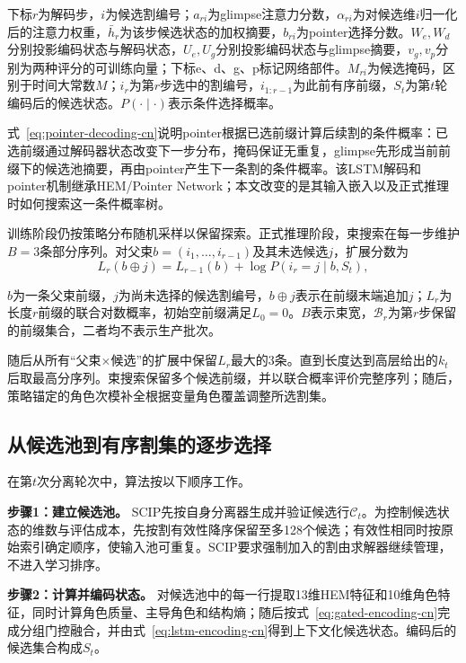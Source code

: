 \documentclass[final,5p,times,twocolumn]{elsarticle}
\begin{document}
下标$r$为解码步，$i$为候选割编号；$a_{ri}$为glimpse注意力分数，$\alpha_{ri}$为对候选维$i$归一化后的注意力权重，$\bar h_r$为该步候选状态的加权摘要，$b_{ri}$为pointer选择分数。$W_e,W_d$分别投影编码状态与解码状态，$U_e,U_g$分别投影编码状态与glimpse摘要，$v_g,v_p$分别为两种评分的可训练向量；下标e、d、g、p标记网络部件。$M_{ri}$为候选掩码，区别于时间大常数$M$；$i_r$为第$r$步选中的割编号，$i_{1:r-1}$为此前有序前缀，$S_t$为第$t$轮编码后的候选状态。$P(\cdot\mid\cdot)$表示条件选择概率。


式~\eqref{eq:pointer-decoding-cn}说明pointer根据已选前缀计算后续割的条件概率：已选前缀通过解码器状态改变下一步分布，掩码保证无重复，glimpse先形成当前前缀下的候选池摘要，再由pointer产生下一条割的条件概率。该LSTM解码和pointer机制继承HEM/Pointer Network；本文改变的是其输入嵌入以及正式推理时如何搜索这一条件概率树。

训练阶段仍按策略分布随机采样以保留探索。正式推理阶段，束搜索在每一步维护$B=3$条部分序列。对父束$b=(i_1,\ldots,i_{r-1})$及其未选候选$j$，扩展分数为
\begin{equation}
L_r(b\oplus j)=L_{r-1}(b)+\log P(i_r=j\mid b,S_t),
\label{eq:beam-score-cn}
\end{equation}

$b$为一条父束前缀，$j$为尚未选择的候选割编号，$b\oplus j$表示在前缀末端追加$j$；$L_r$为长度$r$前缀的联合对数概率，初始空前缀满足$L_0=0$。$B$表示束宽，$\mathcal B_r$为第$r$步保留的前缀集合，二者均不表示生产批次。


随后从所有“父束$\times$候选”的扩展中保留$L_r$最大的3条。直到长度达到高层给出的$k_t$后取最高分序列。束搜索保留多个候选前缀，并以联合概率评价完整序列；随后，策略锚定的角色次模补全根据变量角色覆盖调整所选割集。

\subsection{从候选池到有序割集的逐步选择}

在第$t$次分离轮次中，算法按以下顺序工作。

\noindent\textbf{步骤1：建立候选池。} SCIP先按自身分离器生成并验证候选行$\mathcal C_t$。为控制候选状态的维数与评估成本，先按割有效性降序保留至多128个候选；有效性相同时按原始索引确定顺序，使输入池可重复。SCIP要求强制加入的割由求解器继续管理，不进入学习排序。

\noindent\textbf{步骤2：计算并编码状态。} 对候选池中的每一行提取13维HEM特征和10维角色特征，同时计算角色质量、主导角色和结构熵；随后按式~\eqref{eq:gated-encoding-cn}完成分组门控融合，并由式~\eqref{eq:lstm-encoding-cn}得到上下文化候选状态。编码后的候选集合构成$S_t$。
\end{document}
